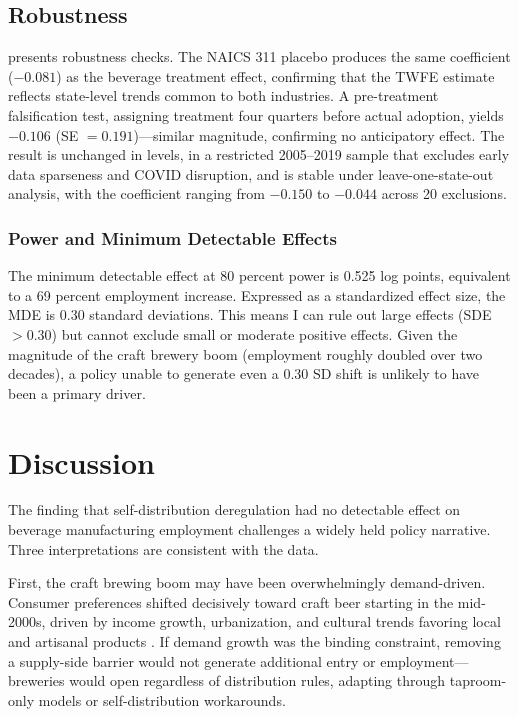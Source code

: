 \documentclass[12pt]{article}
\begin{document}
\subsection{Robustness}



 presents robustness checks. The NAICS 311 placebo produces the same coefficient ($-0.081$) as the beverage treatment effect, confirming that the TWFE estimate reflects state-level trends common to both industries. A pre-treatment falsification test, assigning treatment four quarters before actual adoption, yields $-0.106$ (SE $= 0.191$)---similar magnitude, confirming no anticipatory effect. The result is unchanged in levels, in a restricted 2005--2019 sample that excludes early data sparseness and COVID disruption, and is stable under leave-one-state-out analysis, with the coefficient ranging from $-0.150$ to $-0.044$ across 20 exclusions.

\subsubsection*{Power and Minimum Detectable Effects} The minimum detectable effect at 80 percent power is 0.525 log points, equivalent to a 69 percent employment increase. Expressed as a standardized effect size, the MDE is 0.30 standard deviations. This means I can rule out large effects (SDE $> 0.30$) but cannot exclude small or moderate positive effects. Given the magnitude of the craft brewery boom (employment roughly doubled over two decades), a policy unable to generate even a 0.30 SD shift is unlikely to have been a primary driver.

\section{Discussion}

The finding that self-distribution deregulation had no detectable effect on beverage manufacturing employment challenges a widely held policy narrative. Three interpretations are consistent with the data.

First, the craft brewing boom may have been overwhelmingly demand-driven. Consumer preferences shifted decisively toward craft beer starting in the mid-2000s, driven by income growth, urbanization, and cultural trends favoring local and artisanal products \citep{murray2010craft, elzinga2015craft}. If demand growth was the binding constraint, removing a supply-side barrier would not generate additional entry or employment---breweries would open regardless of distribution rules, adapting through taproom-only models or self-distribution workarounds.
\end{document}
